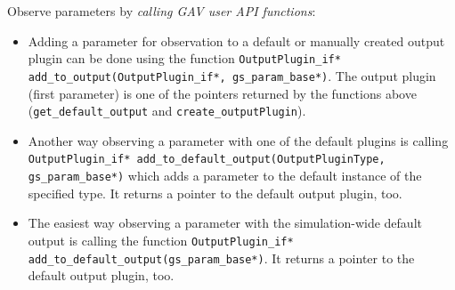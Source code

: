 Observe parameters by {\em calling GAV user API functions}:
\begin{itemize}
  \item Adding a parameter for observation to a default or manually created output plugin can be done using the function
      \mbox{\lstinline|OutputPlugin_if* add_to_output(OutputPlugin_if*, gs_param_base*)|.} The output plugin (first parameter) is one of the pointers returned by the functions above (\lstinline|get_default_output| and \lstinline|create_outputPlugin|).
  
  \item Another way observing a parameter with one of the default plugins is calling \lstinline|OutputPlugin_if* add_to_default_output(OutputPluginType, gs_param_base*)| which adds a parameter to the default instance of the specified type. It returns a pointer to the default output plugin, too.
  
  \item The easiest way observing a parameter with the simulation-wide default output is calling 
  	the function \lstinline|OutputPlugin_if* add_to_default_output(gs_param_base*)|. It returns 
	a pointer to the default output plugin, too.
\end{itemize}

